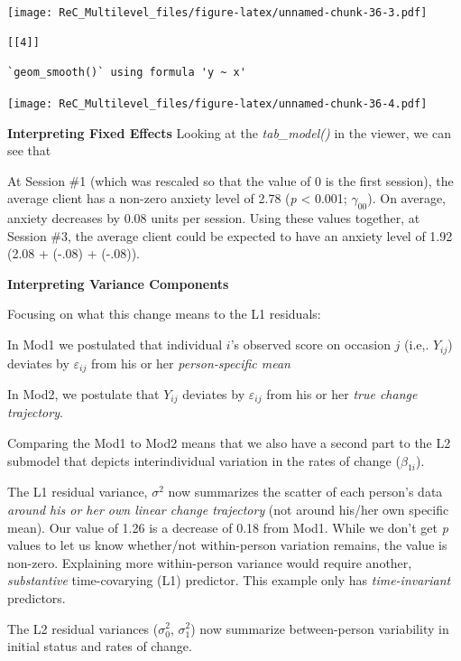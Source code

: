 \documentclass[
  english,
]{book}
\begin{document}
\texttt{[image: ReC\_Multilevel\_files/figure-latex/unnamed-chunk-36-3.pdf]}

\begin{verbatim}
[[4]]
\end{verbatim}

\begin{verbatim}
`geom_smooth()` using formula 'y ~ x'
\end{verbatim}

\texttt{[image: ReC\_Multilevel\_files/figure-latex/unnamed-chunk-36-4.pdf]}

\textbf{Interpreting Fixed Effects}
Looking at the \emph{tab\_model()} in the viewer, we can see that

At Session \#1 (which was rescaled so that the value of 0 is the first session), the average client has a non-zero anxiety level of 2.78 (\emph{p} \textless{} 0.001; \(\gamma _{00}\)). On average, anxiety decreases by 0.08 units per session. Using these values together, at Session \#3, the average client could be expected to have an anxiety level of 1.92 (2.08 + (-.08) + (-.08)).

\textbf{Interpreting Variance Components}

Focusing on what this change means to the L1 residuals:

In Mod1 we postulated that individual \(i\)'s observed score on occasion \(j\) (i.e,. \(Y_{ij}\)) deviates by \(\varepsilon _{ij}\) from his or her \emph{person-specific mean}

In Mod2, we postulate that \(Y_{ij}\) deviates by \(\varepsilon _{ij}\) from his or her \emph{true change trajectory}.

Comparing the Mod1 to Mod2 means that we also have a second part to the L2 submodel that depicts interindividual variation in the rates of change (\(\beta _{1i}\)).

The L1 residual variance, \(\sigma^{2}\) now summarizes the scatter of each person's data \emph{around his or her own linear change trajectory} (not around his/her own specific mean). Our value of 1.26 is a decrease of 0.18 from Mod1. While we don't get \emph{p} values to let us know whether/not within-person variation remains, the value is non-zero. Explaining more within-person variance would require another, \emph{substantive} time-covarying (L1) predictor. This example only has \emph{time-invariant} predictors.

The L2 residual variances (\(\sigma_{0 }^{2}\), \(\sigma_{1 }^{2}\)) now summarize between-person variability in initial status and rates of change.
\end{document}
